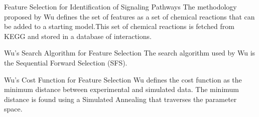 \documentclass{beamer}
\begin{document}


\begin{frame}{Feature Selection for Identification of Signaling 
Pathways}
The methodology proposed by Wu defines the set of features as a set of 
chemical reactions that can be added to a starting model.\pause This set 
of chemical reactions is fetched from KEGG and stored in a database of
interactions.
\end{frame}


\begin{frame}{Wu's Search Algorithm for Feature Selection}
The search algorithm used by Wu is the Sequential Forward Selection 
(SFS).
\end{frame}


\begin{frame}{Wu's Cost Function for Feature Selection}
Wu defines the cost function as the minimum distance between 
experimental and simulated data. 
\pause
The minimum distance is found using a Simulated Annealing 
that traverses the parameter space.
\end{frame}




\end{document}
